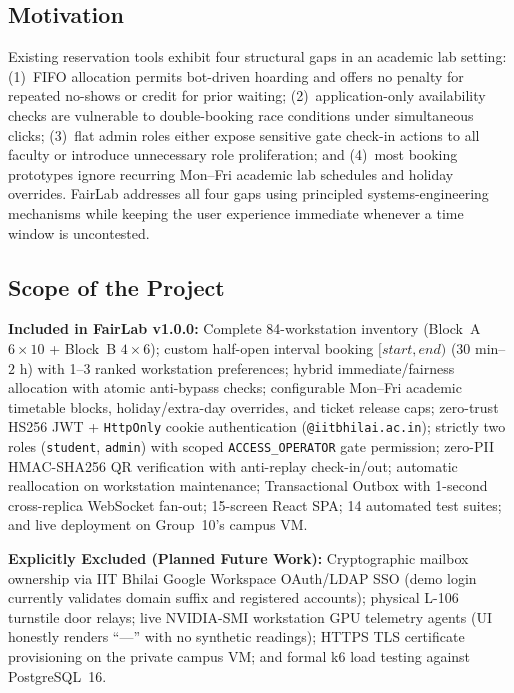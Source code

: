 \documentclass[manuscript,screen,review]{acmart}
\begin{document}
\subsection{Motivation}
Existing reservation tools exhibit four structural gaps in an academic lab setting: (1)~FIFO allocation permits bot-driven hoarding and offers no penalty for repeated no-shows or credit for prior waiting; (2)~application-only availability checks are vulnerable to double-booking race conditions under simultaneous clicks; (3)~flat admin roles either expose sensitive gate check-in actions to all faculty or introduce unnecessary role proliferation; and (4)~most booking prototypes ignore recurring Mon--Fri academic lab schedules and holiday overrides. FairLab addresses all four gaps using principled systems-engineering mechanisms while keeping the user experience immediate whenever a time window is uncontested.

\subsection{Scope of the Project}
\textbf{Included in FairLab v1.0.0:} Complete 84-workstation inventory (Block~A $6\times 10$ + Block~B $4\times 6$); custom half-open interval booking $[start, end)$ ($30\text{ min}$--$2\text{ h}$) with 1--3 ranked workstation preferences; hybrid immediate/fairness allocation with atomic anti-bypass checks; configurable Mon--Fri academic timetable blocks, holiday/extra-day overrides, and ticket release caps; zero-trust HS256 JWT + \texttt{HttpOnly} cookie authentication (\texttt{@iitbhilai.ac.in}); strictly two roles (\texttt{student}, \texttt{admin}) with scoped \texttt{ACCESS\_OPERATOR} gate permission; zero-PII HMAC-SHA256 QR verification with anti-replay check-in/out; automatic reallocation on workstation maintenance; Transactional Outbox with 1-second cross-replica WebSocket fan-out; 15-screen React SPA; 14 automated test suites; and live deployment on Group~10's campus VM.

\textbf{Explicitly Excluded (Planned Future Work):} Cryptographic mailbox ownership via IIT Bhilai Google Workspace OAuth/LDAP SSO (demo login currently validates domain suffix and registered accounts); physical L-106 turnstile door relays; live NVIDIA-SMI workstation GPU telemetry agents (UI honestly renders ``---'' with no synthetic readings); HTTPS TLS certificate provisioning on the private campus VM; and formal k6 load testing against PostgreSQL~16.

\end{document}
